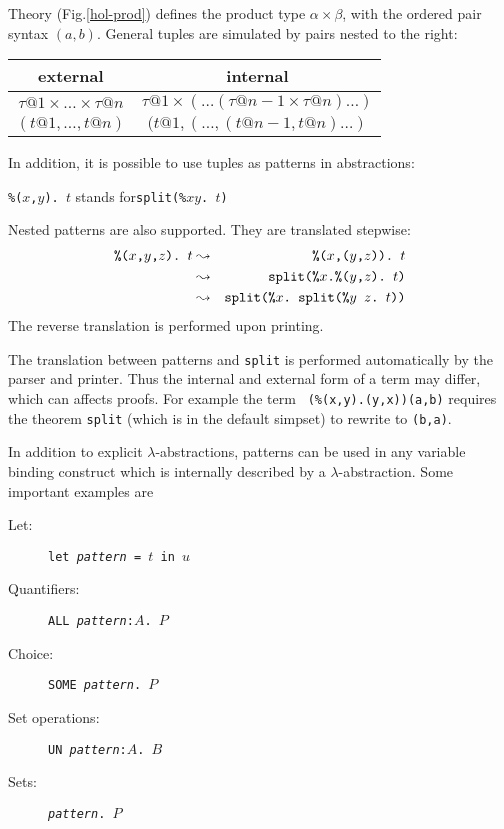 Theory  (Fig.\ts\ref{hol-prod}) defines the product type
$\alpha\times\beta$, with the ordered pair syntax $(a, b)$.  General
tuples are simulated by pairs nested to the right:
\begin{center}
\begin{tabular}{c|c}
external & internal \\
\hline
$\tau@1 \times \dots \times \tau@n$ & $\tau@1 \times (\dots (\tau@{n-1} \times \tau@n)\dots)$ \\
\hline
$(t@1,\dots,t@n)$ & $(t@1,(\dots,(t@{n-1},t@n)\dots)$ \\
\end{tabular}
\end{center}
In addition, it is possible to use tuples
as patterns in abstractions:
\begin{center}
{\tt\%($x$,$y$). $t$} \quad stands for\quad \texttt{split(\%$x$\thinspace$y$.\ $t$)} 
\end{center}
Nested patterns are also supported.  They are translated stepwise:
\begin{eqnarray*}
\hbox{\tt\%($x$,$y$,$z$).\ $t$} 
   & \leadsto & \hbox{\tt\%($x$,($y$,$z$)).\ $t$} \\
   & \leadsto & \hbox{\tt split(\%$x$.\%($y$,$z$).\ $t$)}\\
   & \leadsto & \hbox{\tt split(\%$x$.\ split(\%$y$ $z$.\ $t$))}
\end{eqnarray*}
The reverse translation is performed upon printing.
\begin{warn}
  The translation between patterns and \texttt{split} is performed automatically
  by the parser and printer.  Thus the internal and external form of a term
  may differ, which can affects proofs.  For example the term {\tt
  (\%(x,y).(y,x))(a,b)} requires the theorem \texttt{split} (which is in the
  default simpset) to rewrite to {\tt(b,a)}.
\end{warn}
In addition to explicit $\lambda$-abstractions, patterns can be used in any
variable binding construct which is internally described by a
$\lambda$-abstraction.  Some important examples are
\begin{description}
\item[Let:] \texttt{let {\it pattern} = $t$ in $u$}
\item[Quantifiers:] \texttt{ALL~{\it pattern}:$A$.~$P$}
\item[Choice:] {\underscoreon \tt SOME~{\it pattern}.~$P$}
\item[Set operations:] \texttt{UN~{\it pattern}:$A$.~$B$}
\item[Sets:] \texttt{{\ttlbrace}{\it pattern}.~$P${\ttrbrace}}
\end{description}

